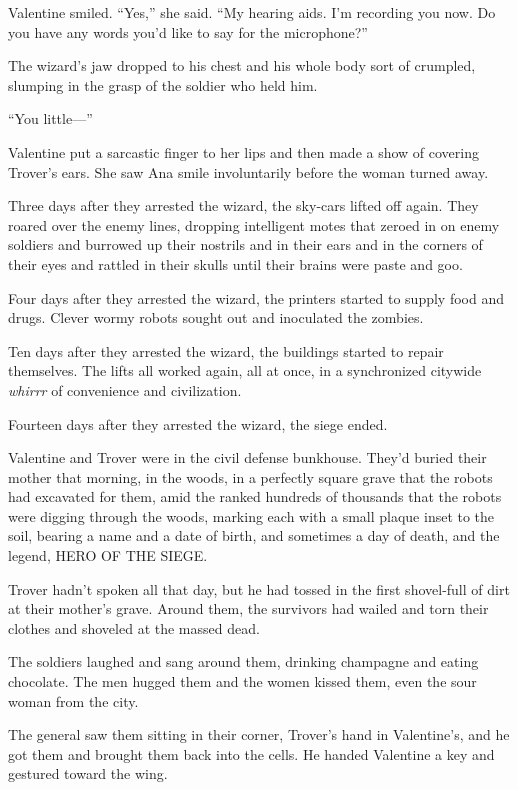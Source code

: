 Valentine smiled. “Yes,” she said. “My hearing aids. I’m recording
you now. Do you have any words you’d like to say for the
microphone?”

The wizard’s jaw dropped to his chest and his whole body sort of
crumpled, slumping in the grasp of the soldier who held him.

“You little---”

Valentine put a sarcastic finger to her lips and then made a show
of covering Trover’s ears. She saw Ana smile involuntarily before
the woman turned away.

\tb

Three days after they arrested the wizard, the sky-cars lifted off
again. They roared over the enemy lines, dropping intelligent motes
that zeroed in on enemy soldiers and burrowed up their nostrils and
in their ears and in the corners of their eyes and rattled in their
skulls until their brains were paste and goo.

Four days after they arrested the wizard, the printers started to
supply food and drugs. Clever wormy robots sought out and
inoculated the zombies.

Ten days after they arrested the wizard, the buildings started to
repair themselves. The lifts all worked again, all at once, in a
synchronized citywide \emph{whirrr} of convenience and
civilization.

Fourteen days after they arrested the wizard, the siege ended.

Valentine and Trover were in the civil defense bunkhouse. They’d
buried their mother that morning, in the woods, in a perfectly
square grave that the robots had excavated for them, amid the
ranked hundreds of thousands that the robots were digging through
the woods, marking each with a small plaque inset to the soil,
bearing a name and a date of birth, and sometimes a day of death,
and the legend, HERO OF THE SIEGE.

Trover hadn’t spoken all that day, but he had tossed in the first
shovel-full of dirt at their mother’s grave. Around them, the
survivors had wailed and torn their clothes and shoveled at the
massed dead.

The soldiers laughed and sang around them, drinking champagne and
eating chocolate. The men hugged them and the women kissed them,
even the sour woman from the city.

The general saw them sitting in their corner, Trover’s hand in
Valentine’s, and he got them and brought them back into the cells.
He handed Valentine a key and gestured toward the wing.

